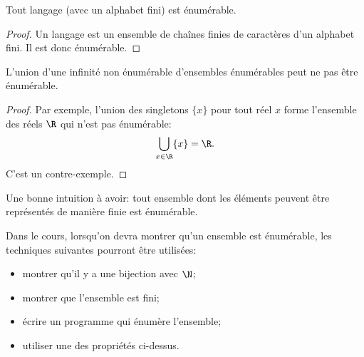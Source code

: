 \begin{myexem}
\begin{myprop}
 Tout langage (avec un alphabet fini) est énumérable.
 \begin{proof}
 Un langage est un ensemble de chaînes finies de caractères d'un alphabet fini. Il est donc énumérable.
 \end{proof}
\end{myprop}

\begin{myprop}
L'union d'une infinité non énumérable d'ensembles énumérables peut ne pas être énumérable.
\end{myprop}
\begin{proof}
Par exemple, l'union des singletons $\{x\}$ pour tout réel $x$ forme l'ensemble des réels $\R$ qui n'est pas énumérable:
\[ \bigcup_{x \in \R} \{x\} = \R. \]
C'est un contre-exemple.
\end{proof}

\begin{myrem}
  Une bonne intuition à avoir:
  tout ensemble dont les éléments peuvent être représentés de manière finie est énumérable.
\end{myrem}

Dans le cours, lorsqu'on devra montrer qu'un ensemble est énumérable,
les techniques suivantes pourront être utilisées:
\begin{itemize}
	\item montrer qu'il y a une bijection avec $\N$;
	\item montrer que l'ensemble est fini;
	\item écrire un programme qui énumère l'ensemble;
	\item utiliser une des propriétés ci-dessus.
\end{itemize}



\end{myexem}
